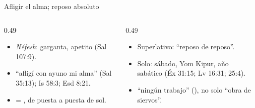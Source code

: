 \begin{frame}{Afligir el alma; reposo absoluto}
\begin{columns}[t,onlytextwidth]
\begin{column}{0.49\textwidth}\small
{}
\begin{itemize}
\item \emph{Néfesh}: garganta, apetito (Sal 107:9).
\item ``afligí con ayuno mi alma'' (Sal 35:13); Is 58:3; Esd 8:21.
\item = , de puesta a puesta de sol.
\end{itemize}
\end{column}
\begin{column}{0.49\textwidth}\small
{}
\begin{itemize}
\item Superlativo: ``reposo de reposo''.
\item Solo: sábado, Yom Kipur, año sabático (Éx 31:15; Lv 16:31; 25:4).
\item ``ningún trabajo'' (), no solo ``obra de siervos''.
\end{itemize}
\end{column}
\end{columns}\par\medskip
{}
\end{frame}

